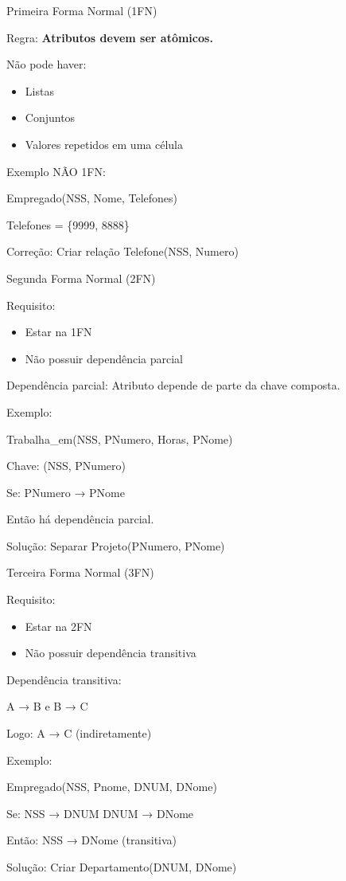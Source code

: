 \documentclass{beamer}
\begin{document}
\begin{frame}{Primeira Forma Normal (1FN)}

Regra:
\textbf{Atributos devem ser atômicos.}

Não pode haver:
\begin{itemize}
    \item Listas
    \item Conjuntos
    \item Valores repetidos em uma célula
\end{itemize}

Exemplo NÃO 1FN:

Empregado(NSS, Nome, Telefones)

Telefones = \{9999, 8888\}

Correção:
Criar relação Telefone(NSS, Numero)

\end{frame}





\begin{frame}{Segunda Forma Normal (2FN)}

Requisito:
\begin{itemize}
    \item Estar na 1FN
    \item Não possuir dependência parcial
\end{itemize}

Dependência parcial:
Atributo depende de parte da chave composta.

Exemplo:

Trabalha\_em(NSS, PNumero, Horas, PNome)

Chave: (NSS, PNumero)

Se:
PNumero → PNome

Então há dependência parcial.

Solução:
Separar Projeto(PNumero, PNome)

\end{frame}





\begin{frame}{Terceira Forma Normal (3FN)}

Requisito:
\begin{itemize}
    \item Estar na 2FN
    \item Não possuir dependência transitiva
\end{itemize}

Dependência transitiva:

A → B e B → C

Logo:
A → C (indiretamente)

Exemplo:

Empregado(NSS, Pnome, DNUM, DNome)

Se:
NSS → DNUM
DNUM → DNome

Então:
NSS → DNome (transitiva)

Solução:
Criar Departamento(DNUM, DNome)

\end{frame}
\end{document}
